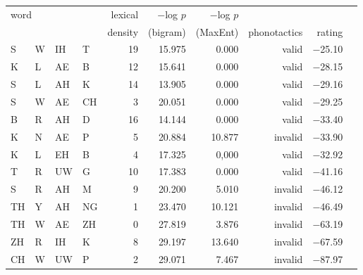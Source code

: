 \begin{longtable}{l@{ } l@{ } l@{ } l r r r r r r} 
\toprule
\multicolumn{4}{l}{\multirow{2}{*}{word}} & lexical & $-$log $p$ & $-$log $p$ \\
&&&& density & (bigram) & (MaxEnt) & phonotactics & rating \\
\midrule
S & W & IH & T   & 19 &  15.975 & 0.000  & valid   & $-$25.10 \\
K & L & AE & B   & 12 &  15.641 & 0.000  & valid   & $-$28.15 \\
S & L & AH & K   & 14 &  13.905 & 0.000  & valid   & $-$29.16 \\
S & W & AE & CH  &  3 &  20.051 & 0.000  & valid   & $-$29.25 \\
B & R & AH & D   & 16 &  14.144 & 0.000  & valid   & $-$33.40 \\
K & N & AE & P   &  5 &  20.884 & 10.877 & invalid & $-$33.90 \\
K & L & EH & B   &  4 &  17.325 & 0,000  & valid   & $-$32.92 \\
T & R & UW & G   & 10 &  17.383 & 0.000  & valid   & $-$41.16 \\
S & R & AH & M   &  9 &  20.200 & 5.010  & invalid & $-$46.12 \\
TH & Y & AH & NG &  1 &  23.470 & 10.121 & invalid & $-$46.49 \\
TH & W & AE & ZH &  0 &  27.819 & 3.876  & invalid & $-$63.19 \\
ZH & R & IH & K  &  8 &  29.197 & 13.640 & invalid & $-$67.59 \\
CH & W & UW & P  &  2 &  29.071 & 7.467  & invalid & $-$87.97 \\
\bottomrule
\end{longtable}
